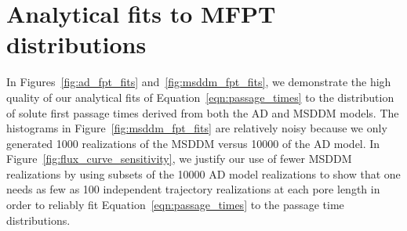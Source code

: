 \documentclass{article}
\begin{document}
%  
%  
  
  \newpage  
  
  \section*{Analytical fits to MFPT distributions}\label{section:mfpt_fits}
  
  In Figures~\ref{fig:ad_fpt_fits} and~\ref{fig:msddm_fpt_fits}, we demonstrate
  the high quality of our analytical fits of Equation~\ref{eqn:passage_times} to 
  the distribution of solute first passage times derived from both the AD
  and MSDDM models. The histograms in Figure~\ref{fig:msddm_fpt_fits} are 
  relatively noisy because we only generated 1000 realizations of the MSDDM 
  versus 10000 of the AD model. In Figure~\ref{fig:flux_curve_sensitivity}, we
  justify our use of fewer MSDDM realizations by using subsets of the 10000 AD 
  model realizations to show that one needs as few as 100 independent trajectory
  realizations at each pore length in order to reliably fit Equation~\ref{eqn:passage_times}
  to the passage time distributions.
  
\end{document}
